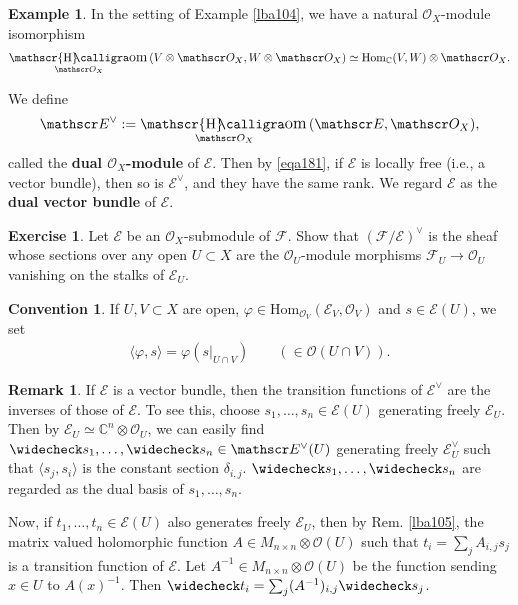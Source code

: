 \documentclass[11pt,b5paper,notitlepage]{article}
\theoremstyle{definition}
\newtheorem{eg}[df]{Example}
\newtheorem{exe}[df]{Exercise}
\newtheorem{rem}[df]{Remark}
\newtheorem{cv}[df]{Convention}
\theoremstyle{plain}
\DeclareMathOperator{\shom}{\mathscr{H}\text{\kern -3pt {\calligra\large om}}\,}
\newcommand{\wch}{\widecheck}
\newcommand{\Hom}{\mathrm{Hom}}
\newcommand{\bk}[1]{\langle {#1}\rangle}
\newcommand{\scr}{\mathscr}
\newcommand{\Cbb}{\mathbb C}
\numberwithin{equation}{section}
\begin{document}
\begin{eg}
	In the setting of Example \ref{lba104}, we have a natural $\scr O_X$-module isomorphism
	\begin{align}
		\shom_{\scr O_X}(V\otimes\scr O_X,W\otimes\scr O_X)\simeq \Hom_\Cbb(V,W)\otimes\scr O_X.	\label{eqa181}
	\end{align}
\end{eg}

We define
\begin{align*}
	\scr E^\vee:=\shom_{\scr O_X}(\scr E,\scr O_X),
\end{align*}
called the \textbf{dual $\scr O_X$-module} of $\scr E$. Then by \eqref{eqa181}, if $\scr E$ is locally free (i.e., a vector bundle), then so is $\scr E^\vee$, and they have the same rank. We regard $\scr E$ as the \textbf{dual vector bundle} of $\scr E$.


\begin{exe}
Let $\scr E$ be an $\scr O_X$-submodule of $\scr F$. Show that $(\scr F/\scr E)^\vee$ is the sheaf whose sections over any open  $U\subset X$ are the $\scr O_U$-module morphisms $\scr F_U\rightarrow\scr O_U$ vanishing on the stalks of $\scr E_U$.
\end{exe}

\begin{cv}
If $U,V\subset X$ are open, $\varphi\in\Hom_{\scr O_V}(\scr E_V,\scr O_V)$ and $s\in\scr E(U)$, we set
\begin{align*}
\bk{\varphi,s}=\varphi(s|_{U\cap V})\qquad (\in\scr O(U\cap V)).	
\end{align*} 
\end{cv}


\begin{rem}
If $\scr E$ is a vector bundle, then the transition functions of $\scr E^\vee$ are the inverses of those of $\scr E$. To see this, choose $s_1,\dots,s_n\in\scr E(U)$ generating freely $\scr E_U$. Then by $\scr E_U\simeq\Cbb^n\otimes\scr O_U$, we can easily find $\wch s_1,\dots,\wch s_n\in\scr E^\vee(U)$ generating freely $\scr E^\vee_U$ such that $\bk{s_j,s_i}$ is the constant section $\delta_{i,j}$. $\wch s_1,\dots,\wch s_n$ are regarded as the dual basis of  $s_1,\dots,s_n$. 

Now, if $t_1,\dots,t_n\in\scr E(U)$ also generates freely $\scr E_U$, then by Rem. \ref{lba105}, the matrix valued holomorphic function $A\in M_{n\times n}\otimes\scr O(U)$ such that $t_i=\sum_j A_{i,j}s_j$ is a transition function of $\scr E$. Let $A^{-1}\in M_{n\times n}\otimes\scr O(U)$ be the function sending $x\in U$ to $A(x)^{-1}$. Then $\wch t_i=\sum_j (A^{-1})_{i,j}\wch s_j$. \hfill\qedsymbol
\end{rem}
\end{document}
